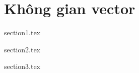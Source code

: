 \documentclass[class=linearalgebra,crop=false]{standalone}
\begin{document}
\chapter{Không gian vector}

{section1.tex}

{section2.tex}

{section3.tex}
\end{document}
